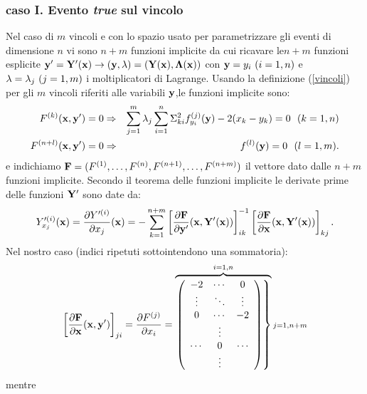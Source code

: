 \subsubsection{caso I. Evento {\em true} sul vincolo}
%
Nel caso di $m$ vincoli e con lo spazio usato per parametrizzare gli eventi di
dimensione $n$ vi sono $n+m$ funzioni implicite da cui ricavare le$n+m$ funzioni esplicite ${\bf y}^\prime={\bf Y}^\prime({\bf x})\rightarrow({\bf y},{\bf \lambda})=({\bf Y}({\bf x}),{\bf \Lambda}({\bf x}))$ con ${\bf y}=y_i\ (i=1,n)$
e ${\bf\lambda}=\lambda_j\ (j=1,m)$ i moltiplicatori di Lagrange. Usando la definizione (\ref{vincoli}) per gli $m$ vincoli riferiti alle variabili ${\bf y}$,le funzioni implicite sono:
\begin{eqnarray*}
F^{(k)}(\bfx,\bfy^\prime)=0 &\Rightarrow&\sum_{j=1}^m\lambda_j\sum_{i=1}^n\Stwo_{ki}\fxes{j}_{y_i}(\bfy)-2(x_k-y_k)=0\ \ (k=1,n)\\
F^{(n+l)}(\bfx,\bfy^\prime)=0&\Rightarrow& f^{(l)}(\bfy)=0\ \ (l=1,m).
\end{eqnarray*}
e indichiamo  ${\bf F}=(F^{(1)},\dots,F^{(n)},F^{(n+1)},\dots,F^{(n+m)})$ il vettore dato dalle $n+m$
funzioni implicite.
Secondo il teorema delle funzioni implicite le derivate prime delle funzioni
${\bf Y}^\prime$ sono date da:
\begin{equation}
\label{Dini_first}Y^{\prime(i)}_{x_j}({\bf x})=\frac{\partial Y^{\prime(i)}}{\partial x_j}({\bf x})=-\sum_{k=1}^{n+m}\left[\frac{\partial{\bf F}}{\partial{\bf y}^\prime}({\bf x},{\bf Y}^\prime({\bf x}))\right]^{-1}_{ik}\left[\frac{\partial{\bf F}}{\partial{\bf x}}({\bf x},{\bf Y}^\prime({\bf x}))\right]_{kj}.
\end{equation}
Nel nostro caso (indici ripetuti sottointendono una sommatoria):
\begin{equation}
\label{dfdx}
\left[\frac{\partial{\bf F}}{\partial{\bf x}}({\bf x},{\bf y}^\prime)\right]_{ji}=\frac{\partial F^{(j)}}{\partial x_i}=\overbrace{\left.\left(\begin{array}{ccc}-2 &\cdots&0 \\\vdots &\ddots&\vdots\\0&\cdots&-2 \\  &\vdots& \\ \cdots &0&\cdots \\ &\vdots& \end{array}\right)\right\}}^{i=1,n}{\scriptstyle j=1,n+m}
\end{equation}
mentre
